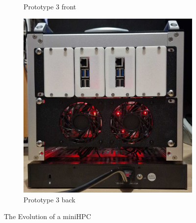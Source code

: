 \begin{frame}
\begin{figure}
\begin{subfigure}[b]{0.24\textwidth}
			\caption{Prototype 3 front}
			\label{fig:2.c}
		\end{subfigure}
		\hfill
		\begin{subfigure}[b]{0.24\textwidth}
			\centering
			\includegraphics[width=\textwidth]{images/mini-HPC-proto3_back.png}
			\caption{Prototype 3 back}
			\label{fig:2.d}
		\end{subfigure}
		\caption{The Evolution of a miniHPC}
		\label{fig:2}
	\end{figure}
	
\end{frame}


